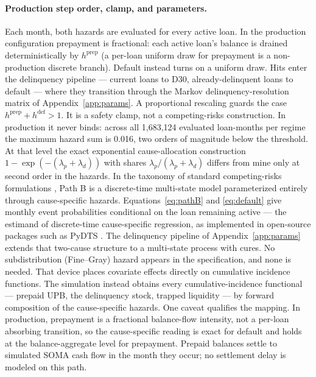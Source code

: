 \documentclass[12pt]{article}
\begin{document}
\paragraph{Production step order, clamp, and parameters.}
Each month, both hazards are evaluated for every active loan. In the production configuration prepayment is fractional: each active loan's balance is drained deterministically by $h^{\mathrm{prep}}$ (a per-loan uniform draw for prepayment is a non-production discrete branch). Default instead turns on a uniform draw. Hits enter the delinquency pipeline --- current loans to D30, already-delinquent loans to default --- where they transition through the Markov delinquency-resolution matrix of Appendix~\ref{app:params}. A proportional rescaling guards the case $h^{\mathrm{prep}} + h^{\mathrm{def}} > 1$. It is a safety clamp, not a competing-risks construction. In production it never binds: across all 1,683,124 evaluated loan-months per regime the maximum hazard sum is 0.016, two orders of magnitude below the threshold. At that level the exact exponential cause-allocation construction $1-\exp(-(\lambda_p+\lambda_d))$ with shares $\lambda_p/(\lambda_p+\lambda_d)$ differs from mine only at second order in the hazards. In the taxonomy of standard competing-risks formulations \citep{putter2007}, Path B is a discrete-time multi-state model parameterized entirely through cause-specific hazards. Equations~\eqref{eq:pathB} and \eqref{eq:default} give monthly event probabilities conditional on the loan remaining active --- the estimand of discrete-time cause-specific regression, as implemented in open-source packages such as PyDTS \citep{meir2025}. The delinquency pipeline of Appendix~\ref{app:params} extends that two-cause structure to a multi-state process with cures. No subdistribution (Fine--Gray) hazard \citep{fine1999} appears in the specification, and none is needed. That device places covariate effects directly on cumulative incidence functions. The simulation instead obtains every cumulative-incidence functional --- prepaid UPB, the delinquency stock, trapped liquidity --- by forward composition of the cause-specific hazards. One caveat qualifies the mapping. In production, prepayment is a fractional balance-flow intensity, not a per-loan absorbing transition, so the cause-specific reading is exact for default and holds at the balance-aggregate level for prepayment. Prepaid balances settle to simulated SOMA cash flow in the month they occur; no settlement delay is modeled on this path.
\end{document}
